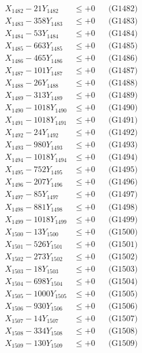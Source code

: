\documentclass[a4paper,10pt]{article}
\begin{document}
{\begin{align}
X_{1482} - 21Y_{1482} &\leq +0 && \text{(G1482)} \\
X_{1483} - 358Y_{1483} &\leq +0 && \text{(G1483)} \\
X_{1484} - 53Y_{1484} &\leq +0 && \text{(G1484)} \\
X_{1485} - 663Y_{1485} &\leq +0 && \text{(G1485)} \\
X_{1486} - 465Y_{1486} &\leq +0 && \text{(G1486)} \\
X_{1487} - 101Y_{1487} &\leq +0 && \text{(G1487)} \\
X_{1488} - 26Y_{1488} &\leq +0 && \text{(G1488)} \\
X_{1489} - 313Y_{1489} &\leq +0 && \text{(G1489)} \\
X_{1490} - 1018Y_{1490} &\leq +0 && \text{(G1490)} \\
\allowbreak
X_{1491} - 1018Y_{1491} &\leq +0 && \text{(G1491)} \\
X_{1492} - 24Y_{1492} &\leq +0 && \text{(G1492)} \\
X_{1493} - 980Y_{1493} &\leq +0 && \text{(G1493)} \\
X_{1494} - 1018Y_{1494} &\leq +0 && \text{(G1494)} \\
X_{1495} - 752Y_{1495} &\leq +0 && \text{(G1495)} \\
X_{1496} - 207Y_{1496} &\leq +0 && \text{(G1496)} \\
X_{1497} - 85Y_{1497} &\leq +0 && \text{(G1497)} \\
X_{1498} - 881Y_{1498} &\leq +0 && \text{(G1498)} \\
X_{1499} - 1018Y_{1499} &\leq +0 && \text{(G1499)} \\
X_{1500} - 13Y_{1500} &\leq +0 && \text{(G1500)} \\
\allowbreak
X_{1501} - 526Y_{1501} &\leq +0 && \text{(G1501)} \\
X_{1502} - 273Y_{1502} &\leq +0 && \text{(G1502)} \\
X_{1503} - 18Y_{1503} &\leq +0 && \text{(G1503)} \\
X_{1504} - 698Y_{1504} &\leq +0 && \text{(G1504)} \\
X_{1505} - 1000Y_{1505} &\leq +0 && \text{(G1505)} \\
X_{1506} - 930Y_{1506} &\leq +0 && \text{(G1506)} \\
X_{1507} - 14Y_{1507} &\leq +0 && \text{(G1507)} \\
X_{1508} - 334Y_{1508} &\leq +0 && \text{(G1508)} \\
X_{1509} - 130Y_{1509} &\leq +0 && \text{(G1509)} \\

\end{align}}
\end{document}
